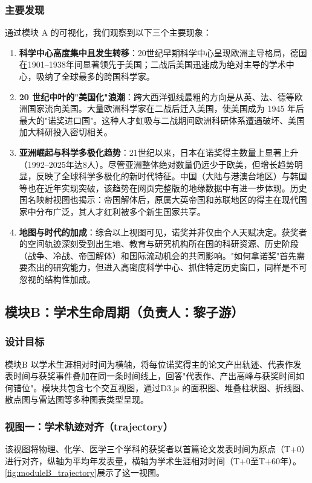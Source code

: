 \documentclass[UTF8]{CjC}
\theoremstyle{mystyle}
\begin{document}
\subsubsection{主要发现}
通过模块 A 的可视化，我们观察到以下三个主要现象：
\begin{enumerate}
    \item \textbf{科学中心高度集中且发生转移}：20世纪早期科学中心呈现欧洲主导格局，德国在1901–1938年间显著领先于美国；二战后美国迅速成为绝对主导的学术中心，吸纳了全球最多的跨国科学家。
    \item \textbf{20 世纪中叶的"美国化"浪潮}：跨大西洋弧线最粗的方向是从英、法、德等欧洲国家流向美国。大量欧洲科学家在二战后迁入美国，使美国成为 1945 年后最大的"诺奖进口国"。这种人才虹吸与二战期间欧洲科研体系遭遇破坏、美国加大科研投入密切相关。
    \item \textbf{亚洲崛起与科学多极化趋势}：21世纪以来，日本在诺奖得主数量上显著上升（1992–2025年达8人）。尽管亚洲整体绝对数量仍远少于欧美，但增长趋势明显，反映了全球科学多极化的新时代特征。中国（大陆与港澳台地区）与韩国等也在近年实现突破，该趋势在网页完整版的地缘数据中有进一步体现。历史国名映射视图也揭示：帝国解体后，原属大英帝国和苏联地区的得主在现代国家中分布广泛，其人才红利被多个新生国家共享。
    \item \textbf{地图与时代的加成}：综合以上视图可见，诺奖并非仅由个人天赋决定。获奖者的空间轨迹深刻受到出生地、教育与研究机构所在国的科研资源、历史阶段（战争、冷战、帝国解体）和国际流动机会的共同影响。"如何拿诺奖"首先需要杰出的研究能力，但进入高密度科学中心、抓住特定历史窗口，同样是不可忽视的结构性加成。
\end{enumerate}

\subsection{模块B：学术生命周期（负责人：黎子游）}

\subsubsection{设计目标}
模块B 以学术生涯相对时间为横轴，将每位诺奖得主的论文产出轨迹、代表作发表时间与获奖事件叠加在同一条时间线上，回答"代表作、产出高峰与获奖时间如何错位"。模块共包含七个交互视图，通过D3.js 的面积图、堆叠柱状图、折线图、散点图与雷达图等多种图表类型呈现。

\subsubsection{视图一：学术轨迹对齐（trajectory）}
该视图将物理、化学、医学三个学科的获奖者以首篇论文发表时间为原点（T+0）进行对齐，纵轴为平均年发表量，横轴为学术生涯相对时间（T+0至T+60年）。\autoref{fig:moduleB_trajectory}展示了这一视图。
\end{document}
